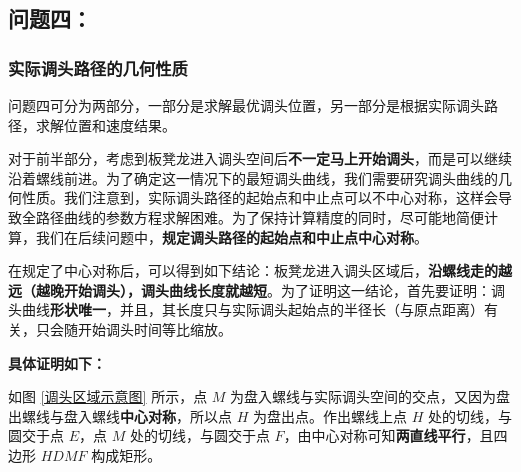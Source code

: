 \documentclass[zihao=-4, UTF8]{article}		%
\theoremstyle{MyLineTheoremStyle} %
\theoremstyle{MyBlockTheoremStyle} %
\theoremstyle{MySubsubsectionStyle} %
\begin{document}
%
%



\subsection{问题四：}

\subsubsection{实际调头路径的几何性质}

问题四可分为两部分，一部分是求解最优调头位置，另一部分是根据实际调头路径，求解位置和速度结果。

对于前半部分，考虑到板凳龙进入调头空间后\textbf{不一定马上开始调头}，而是可以继续沿着螺线前进。为了确定这一情况下的最短调头曲线，我们需要研究调头曲线的几何性质。我们注意到，实际调头路径的起始点和中止点可以不中心对称，这样会导致全路径曲线的参数方程求解困难。为了保持计算精度的同时，尽可能地简便计算，我们在后续问题中，\textbf{规定调头路径的起始点和中止点中心对称}。

在规定了中心对称后，可以得到如下结论：板凳龙进入调头区域后，\textbf{沿螺线走的越远（越晚开始调头），调头曲线长度就越短}。为了证明这一结论，首先要证明：调头曲线\textbf{形状唯一}，并且，其长度只与实际调头起始点的半径长（与原点距离）有关，只会随开始调头时间等比缩放。

\textbf{具体证明如下：}

如图 \ref*{调头区域示意图} 所示，点 $M$ 为盘入螺线与实际调头空间的交点，又因为盘出螺线与盘入螺线\textbf{中心对称}，所以点 $H$ 为盘出点。作出螺线上点 $H$ 处的切线，与圆交于点 $E$，点 $M$ 处的切线，与圆交于点 $F$，由中心对称可知\textbf{两直线平行}，且四边形 $HDMF$ 构成矩形。
\end{document}
